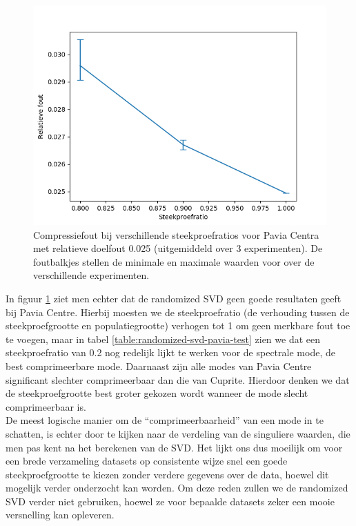 \begin{figure}[]
  \centering
  \includegraphics[scale=0.7]{images/randomized_svd_pavia_ratios.png}
  \caption{Compressiefout bij verschillende steekproefratios voor Pavia Centra met relatieve doelfout 0.025 (uitgemiddeld over 3 experimenten). De foutbalkjes stellen de minimale en maximale waarden voor over de verschillende experimenten.}
\label{fig:randomized-svd-pavia-ratios}
\end{figure}

In figuur \ref{fig:randomized-svd-pavia-ratios} ziet men echter dat de randomized SVD geen goede resultaten geeft bij Pavia Centre. Hierbij moesten we de steekproefratio (de verhouding tussen de steekproefgrootte en populatiegrootte) verhogen tot 1 om geen merkbare fout toe te voegen, maar in tabel \ref{table:randomized-svd-pavia-test} zien we dat een steekproefratio van 0.2 nog redelijk lijkt te werken voor de spectrale mode, de best comprimeerbare mode. Daarnaast zijn alle modes van Pavia Centre significant slechter comprimeerbaar dan die van Cuprite. Hierdoor denken we dat de steekproefgrootte best groter gekozen wordt wanneer de mode slecht comprimeerbaar is.\\

De meest logische manier om de ``comprimeerbaarheid'' van een mode in te schatten, is echter door te kijken naar de verdeling van de singuliere waarden, die men pas kent na het berekenen van de SVD. Het lijkt ons dus moeilijk om voor een brede verzameling datasets op consistente wijze snel een goede steekproefgrootte te kiezen zonder verdere gegevens over de data, hoewel dit mogelijk verder onderzocht kan worden. Om deze reden zullen we de randomized SVD verder niet gebruiken, hoewel ze voor bepaalde datasets zeker een mooie versnelling kan opleveren.

